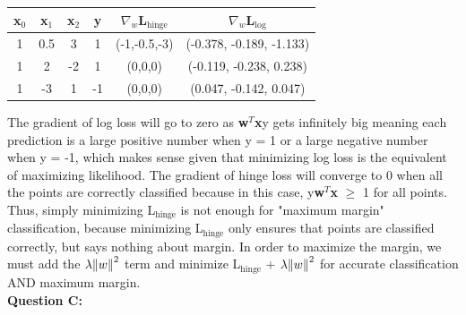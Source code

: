 \documentclass[12 pt]{article}
\begin{document}
		\begin{center}
			\begin{tabular}{c| c|c|c|c|c} 
				\hline
				x$_0$ & x$_1$ & x$_2$ & y & $\nabla_w$L$_{\text{hinge}}$  & $\nabla_w$L$_{\text{log}}$ \\ 
				\hline
				1 &0.5 & 3 & 1 & (-1,-0.5,-3) & (-0.378, -0.189, -1.133) \\ 
				1 &2 & -2 & 1 & (0,0,0) & (-0.119, -0.238, 0.238) \\
				1 &-3 & 1 & -1 & (0,0,0) & (0.047, -0.142, 0.047)\\
				\hline 
			\end{tabular}
		\end{center} 
	\noindent \newline The gradient of log loss will go to zero as \textbf{w}$^T$\textbf{x}y gets infinitely big meaning each prediction is a large positive number when y = 1 or a large negative number when y = -1, which makes sense given that minimizing log loss is the equivalent of maximizing likelihood. The gradient of hinge loss will converge to 0 when all the points are correctly classified because in this case, y\textbf{w}$^T$\textbf{x} $\geq$ 1 for all points. Thus, simply minimizing L$_\text{hinge}$ is not enough for "maximum margin" classification, because minimizing L$_\text{hinge}$ only ensures that points are classified correctly, but says nothing about margin. In order to maximize the margin, we must add the $\lambda\norm{w}^2$ term and minimize L$_\text{hinge}$ + $\lambda\norm{w}^2$ for accurate classification AND maximum margin. \\

	\noindent\textbf{Question C:} \noindent 
		\begin{figure}[H]
			\centering
		\end{figure}
		
\end{document}
